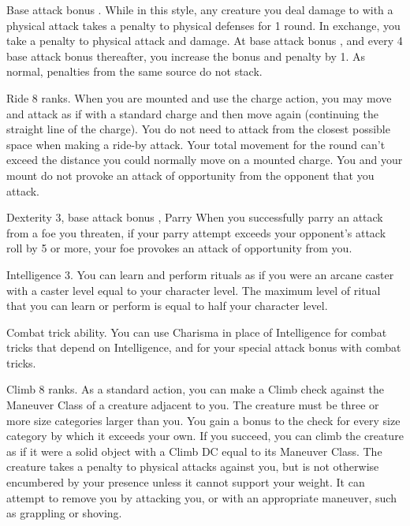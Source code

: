\featpre Base attack bonus .
 While in this style, any creature you deal damage to with a physical attack takes a  penalty to physical defenses for 1 round. In exchange, you take a  penalty to physical attack and damage. At base attack bonus , and every 4 base attack bonus thereafter, you increase the bonus and penalty by 1. As normal, penalties from the same source do not stack.

\featpre Ride 8 ranks.
 When you are mounted and use the charge action, you may move and attack as if with a standard charge and then move again (continuing the straight line of the charge). You do not need to attack from the closest possible space when making a ride-by attack. Your total movement for the round can't exceed the distance you could normally move on a mounted charge. You and your mount do not provoke an attack of opportunity from the opponent that you attack.

\featpre Dexterity 3, base attack bonus , Parry
\featben When you successfully parry an attack from a foe you threaten, if your parry attempt exceeds your opponent's attack roll by 5 or more, your foe provokes an attack of opportunity from you.

\featpre Intelligence 3.
\featben You can learn and perform rituals as if you were an arcane caster with a caster level equal to your character level. The maximum level of ritual that you can learn or perform is equal to half your character level.

\featpre Combat trick ability.
\featben You can use Charisma in place of Intelligence for combat tricks that depend on Intelligence, and for your special attack bonus with combat tricks.

\featpre Climb 8 ranks.
\featben As a standard action, you can make a Climb check against the Maneuver Class of a creature adjacent to you. The creature must be three or more size categories larger than you. You gain a  bonus to the check for every size category by which it exceeds your own. If you succeed, you can climb the creature as if it were a solid object with a Climb DC equal to its Maneuver Class. The creature takes a  penalty to physical attacks against you, but is not otherwise encumbered by your presence unless it cannot support your weight. It can attempt to remove you by attacking you, or with an appropriate maneuver, such as grappling or shoving.

